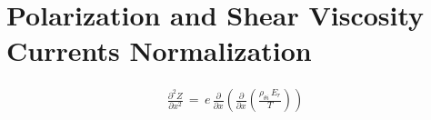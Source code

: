 \chapter{Polarization and Shear Viscosity Currents Normalization}\label{chapter:Normalization}
\begin{align}
	\frac{\partial^2 Z}{\partial x^2} \,=\, e \, \frac{\partial}{\partial x}
		\left(\frac{\partial}{\partial x} \left(\frac{\rho_{\theta i} \, E_r}
		{T}\right)\right)
\end{align}

